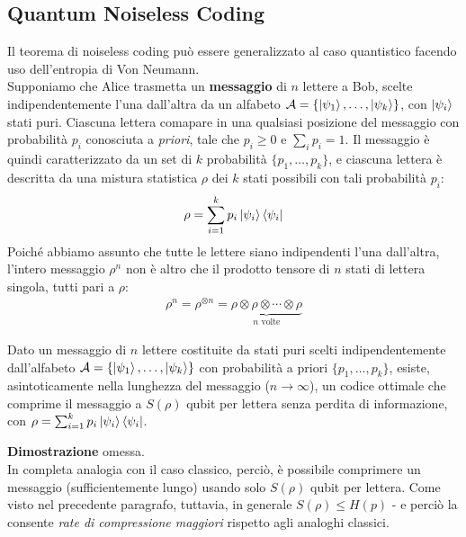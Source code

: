 \documentclass[../../InformazioneQuantistica.tex]{subfiles}
\begin{document}
\subsection{Quantum Noiseless Coding}
Il teorema di noiseless coding può essere generalizzato al caso quantistico facendo uso dell'entropia di Von Neumann.\\

Supponiamo che Alice trasmetta un \textbf{messaggio} di $n$ lettere a Bob, scelte indipendentemente l'una dall'altra da un alfabeto $\mathcal{A} = \{\Ket{\psi_1}, \dots, \Ket{\psi_k}\}$, con $\Ket{\psi_i}$ stati puri. Ciascuna lettera comapare in una qualsiasi posizione del messaggio con probabilità $p_i$ conosciuta a \textit{priori}, tale che $p_i\geq 0$ e $\sum_i p_i = 1$. Il messaggio è quindi caratterizzato da un set di $k$ probabilità $\{p_1, \dots, p_k\}$, e ciascuna lettera è descritta da una mistura statistica $\rho$ dei $k$ stati possibili con tali probabilità $p_i$:
\begin{align*}
\rho = \sum_{i=1}^k p_i \Ket{\psi_i}\Bra{\psi_i}
\end{align*}
Poiché abbiamo assunto che tutte le lettere siano indipendenti l'una dall'altra, l'intero messaggio $\rho^n$ non è altro che il prodotto tensore di $n$ stati di lettera singola, tutti pari a $\rho$:
\begin{align*}
\rho^n = \rho^{\otimes n} = \underbrace{\rho \otimes \rho \otimes \cdots \otimes \rho}_{n\text{ volte}}
\end{align*}

\begin{thm}
Dato un messaggio di $n$ lettere costituite da stati puri scelti indipendentemente dall'alfabeto $\mathcal{A} = \{\Ket{\psi_1}, \dots, \Ket{\psi_k}\}$ con probabilità a priori $\{p_1, \dots, p_k\}$, esiste, asintoticamente nella lunghezza del messaggio ($n\to \infty$), un codice ottimale che comprime il messaggio a $S(\rho)$ qubit per lettera senza perdita di informazione, con $\rho = \sum_{i=1}^k p_i \Ket{\psi_i}\Bra{\psi_i}$.
\end{thm}

\textbf{Dimostrazione} omessa.\\

In completa analogia con il caso classico, perciò, è possibile comprimere un messaggio (sufficientemente lungo) usando solo $S(\rho)$ qubit per lettera. Come visto nel precedente paragrafo, tuttavia, in generale $S(\rho) \leq H(p)$ - e perciò la \MQ consente \textit{rate di compressione maggiori} rispetto agli analoghi classici.
\end{document}
